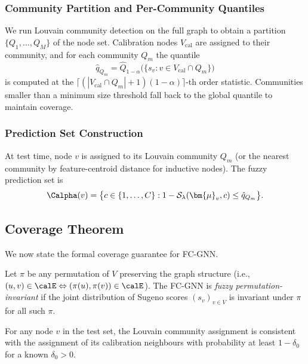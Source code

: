 \subsubsection{Community Partition and Per-Community Quantiles}

We run Louvain community detection \citep{blondel08} on the full graph to
obtain a partition $\{Q_1, \ldots, Q_M\}$ of the node set.
Calibration nodes $V_\text{cal}$ are assigned to their community, and for
each community $Q_m$ the quantile
\[
  \hat{q}_{Q_m}
  = \hat{Q}_{1-\alpha}\bigl(\{s_v : v \in V_\text{cal} \cap Q_m\}\bigr)
\]
is computed at the $\lceil(|V_\text{cal} \cap Q_m|+1)(1-\alpha)\rceil$-th
order statistic.
Communities smaller than a minimum size threshold fall back to the global
quantile to maintain coverage.

\subsubsection{Prediction Set Construction}

At test time, node $v$ is assigned to its Louvain community $Q_m$ (or the
nearest community by feature-centroid distance for inductive nodes).
The fuzzy prediction set is
\[
  \Calpha(v)
  = \bigl\{c \in \{1,\ldots,C\} :
    1 - \mathcal{S}_\lambda(\bm{\mu}_v, c) \le \hat{q}_{Q_m}\bigr\}.
\]

\subsection{Coverage Theorem}
\label{sec:theorem}

We now state the formal coverage guarantee for FC-GNN.

\begin{definition}
\label{def:fpi}
Let $\pi$ be any permutation of $V$ preserving the graph structure
(i.e., $(u,v) \in \calE \Leftrightarrow (\pi(u),\pi(v)) \in \calE$).
The FC-GNN is \emph{fuzzy permutation-invariant} if the joint distribution
of Sugeno scores $(s_v)_{v \in V}$ is invariant under $\pi$ for all such $\pi$.
\end{definition}

\begin{assumption}
\label{ass:community}
For any node $v$ in the test set, the Louvain community assignment is
consistent with the assignment of its calibration neighbours with probability
at least $1 - \delta_0$ for a known $\delta_0 > 0$.
\end{assumption}

